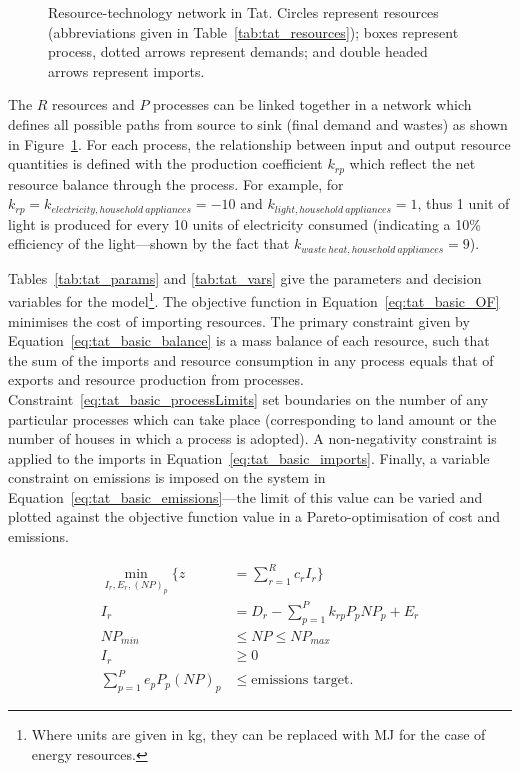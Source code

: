 \begin{figure}[h]
	\centering
	
	\caption{Resource-technology network in Tat. Circles represent resources (abbreviations given in Table~\ref{tab:tat_resources}); boxes represent process, dotted arrows represent demands; and double headed arrows represent imports.} \label{fig:tat_network}
\end{figure}

 

The $R$ resources and $P$ processes can be linked together in a network which defines all possible paths from source to sink (final demand and wastes) as shown in Figure~\ref{fig:tat_network}. For each process, the relationship between input and output resource quantities is defined with the production coefficient $k_{rp}$ which reflect the net resource balance through the process. For example, for $k_{rp}=k_{electricity, household~appliances}=-10$ and $k_{light, household~appliances}=1$, thus 1 unit of light is produced for every 10 units of electricity consumed (indicating a 10\% efficiency of the light---shown by the fact that $k_{waste~heat, household~appliances}=9$).

Tables~\ref{tab:tat_params} and \ref{tab:tat_vars} give the parameters and decision variables for the model\footnote{Where units are given in kg, they can be replaced with MJ for the case of energy resources.}. The objective function in Equation~\eqref{eq:tat_basic_OF} minimises the cost of importing resources. The primary constraint given by Equation~\eqref{eq:tat_basic_balance} is a mass balance of each resource, such that the sum of the imports and resource consumption in any process equals that of exports and resource production from processes. Constraint~\eqref{eq:tat_basic_processLimits} set boundaries on the number of any particular processes which can take place (corresponding to land amount or the number of houses in which a process is adopted). A non-negativity constraint is applied to the imports in Equation~\eqref{eq:tat_basic_imports}. Finally, a variable constraint on emissions is imposed on the system in Equation~\eqref{eq:tat_basic_emissions}---the limit of this value can be varied and plotted against the objective function value in a Pareto-optimisation of cost and emissions.

\begin{align}
	\min_{I_r,E_r,(NP)_p} \Bigg\{z&=\sum_{r=1}^R c_rI_{r} \Bigg\} \label{eq:tat_basic_OF} \\
	I_r&=D_r-\sum_{p=1}^{P}k_{rp} P_p NP_p + E_r \label{eq:tat_basic_balance} \\
	NP_{min} &\leq NP \leq NP_{max} \label{eq:tat_basic_processLimits} \\			
	I_r &\geq 0 \label{eq:tat_basic_imports} \\
	\sum_{p=1}^P e_p P_p (NP)_p &\leq \mbox{emissions target} \label{eq:tat_basic_emissions}.
\end{align}
 
 

